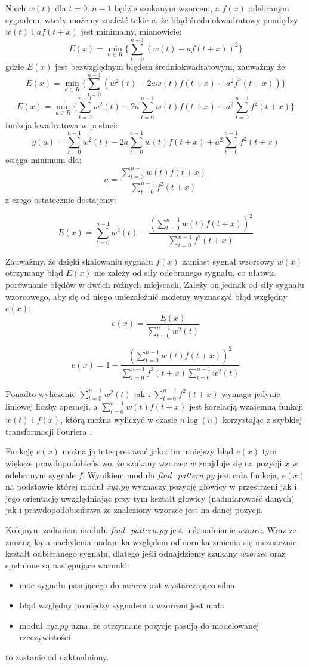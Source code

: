 Niech $w(t)$  dla $t = 0..n-1$ będzie szukanym wzorcem, a $f(x)$ odebranym sygnałem,
wtedy możemy znaleźć takie $a$, że błąd średniokwadratowy pomiędzy $w(t)$ i $a f(t+x)$ jest minimalny, mianowicie:
\[
  E(x) = \min_{a \in R} \{ \sum_{t=0}^{n-1}  (w(t) - a f(t+x))^2 \}
\]
gdzie $E(x)$ jest bezwzględnym błędem średniokwadratowym, zauważmy że:
\[
  E(x) = \min_{a \in R} \{ \sum_{t=0}^{n-1}  (w^2(t) -2a w(t) f(t+x) + a^2 f^2(t+x)) \}
\]
\[
  E(x) = \min_{a \in R} \{ \sum_{t=0}^{n-1}  w^2(t) -2a \sum_{t=0}^{n-1}  w(t) f(t+x) + a^2 \sum_{t=0}^{n-1} f^2(t+x) \}
\]
funkcja kwadratowa w postaci:
\[
  y(a) = \sum_{t=0}^{n-1}  w^2(t) -2a \sum_{t=0}^{n-1}  w(t) f(t+x) + a^2 \sum_{t=0}^{n-1} f^2(t+x)
\]
osiąga minimum dla:
\[
 a = \frac{ \sum\limits_{t=0}^{n-1}  w(t) f(t+x) }{ \sum\limits_{t=0}^{n-1} f^2(t+x) }
\]
z czego ostatecznie dostajemy:

\[
  E(x) = \sum_{t=0}^{n-1}  w^2(t)  - \frac {(\sum\limits_{t=0}^{n-1}  w(t) f(t+x) )^2 } { \sum\limits_{t=0}^{n-1} f^2(t+x)}
\]

Zauważmy, że dzięki skalowaniu sygnału $f(x)$ zamiast sygnał wzorcowy $w(x)$
otrzymany błąd $E(x)$ nie zależy od siły odebranego sygnału, co ułatwia porównanie błędów w dwóch różnych miejscach,
Zależy on jednak od siły sygnału wzorcowego, aby się od niego uniezależnić możemy wyznaczyć
błąd względny $e(x)$:
\[
  e(x) = \frac{E(x)}{\sum\limits_{t=0}^{n-1}  w^2(t)}
\]

\[
  e(x) = 1 - \frac {(\sum\limits_{t=0}^{n-1}  w(t) f(t+x) )^2 } { \sum\limits_{t=0}^{n-1} f^2(t+x) \sum\limits_{t=0}^{n-1}  w^2(t)}
\]

Ponadto wyliczenie $ \sum\limits_{t=0}^{n-1}  w^2(t) $ 
jak i $\sum\limits_{t=0}^{n-1} f^2(t+x)$ wymaga jedynie liniowej liczby operacji, a 
 $\sum\limits_{t=0}^{n-1}  w(t) f(t+x)  $ jest korelacją wzajemną funkcji $w(t)$ i $f(x)$, którą
 można wyliczyć w czasie $n \log(n)$ korzystając z szybkiej transformacji Fouriera \cite{bib:FFT_correlation}.
 
 Funkcję $e(x)$  można ją interpretować jako:
 im mniejszy błąd $e(x)$ tym większe prawdopodobieństwo, że szukany wzorzec $w$ znajduje się na pozycji $x$ w 
 odebranym sygnale $f$. 
 Wynikiem modułu \textit{find\_pattern.py} jest cała funkcja, $e(x)$ na podstawie której moduł \textit{xyz.py}
 wyznaczy pozycję głowicy w przestrzeni jak i jego orientację uwzględniając przy tym 
 kształt głowicy (nadmiarowość danych) jak i prawdopodobieństwa że znaleziony wzorzec jest na danej pozycji.
 
 Kolejnym zadaniem modułu \textit{find\_pattern.py} jest uaktualnianie \textit{wzorca}.
 Wraz ze zmianą kąta nachylenia nadajnika względem odbiornika zmienia się nieznacznie kształt odbieranego sygnału,
 dlatego jeśli odnajdziemy szukany \textit{wzorzec} oraz spełnione są następujące warunki:
 \begin{itemize}
  \item moc sygnału pasującego do \textit{wzorca} jest wystarczająco silna
  \item błąd względny pomiędzy sygnałem a wzorcem jest mała
  \item moduł \textit{xyz.py} uzna, że otrzymane pozycje pasują do modelowanej rzeczywistości
 \end{itemize}
to zostanie od uaktualniony.
  
